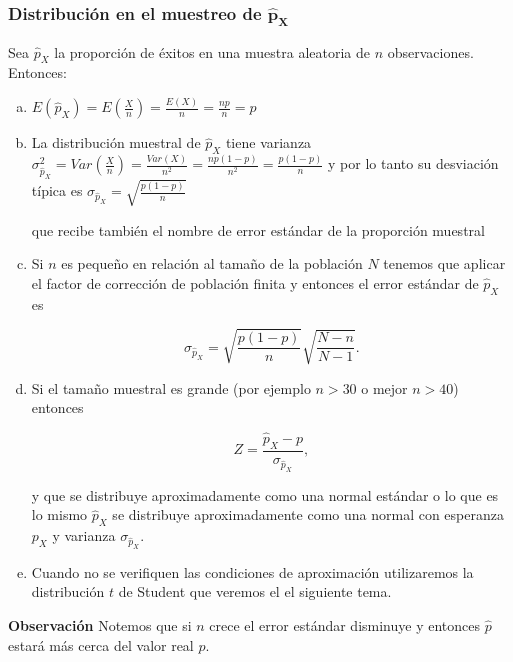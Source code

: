 \documentclass[12pt]{report}
\begin{document}
    \subsubsection{Distribución en el muestreo de   $\mathbf{\hat{p}_{X}}$}

    Sea   $\hat{p}_{X}$ la proporción de éxitos en una muestra
    aleatoria de $n$ observaciones. Entonces:

    \begin{enumerate}[a)]
    \item  $E(\hat{p}_{X})=E(\frac{X}{n})=\frac{E(X)}{n}=\frac{np}{n}=p$
    \item  La distribución muestral de $\hat{p}_{X}$  tiene
    varianza $\sigma_{\hat{p}_{X}}^2=Var(\frac{X}{n})=\frac{Var(X)}{n^2}
    =\frac{np(1-p)}{n^2}=\frac{p(1-p)}{n}$ y por lo tanto su desviación
    típica es
    $\sigma_{\hat{p}_{X} }=\sqrt{\frac{p(1-p)}{n}}$

    que recibe también el nombre de error estándar de la proporción
    muestral
    \item Si $n$ es pequeño en relación al tamaño de la población $N$
    tenemos que aplicar el factor de corrección de población finita
  y entonces el error estándar de  $\hat{p}_{X}$  es

    $$\sigma_{\hat{p}_{X} }=\sqrt{\frac{p(1-p)}{n}}
  \sqrt{\frac{N-n}{N-1}}.$$
  \item Si el tamaño muestral es grande (por ejemplo $n>30$ o mejor  $n>40$) entonces

  $$Z=\frac{\hat{p}_{X}- p}{\sigma_{\hat{p}_{X}}},$$

  y que se distribuye aproximadamente como una normal estándar
  o lo que es lo mismo $\hat{p}_{X}$ se distribuye aproximadamente
  como una normal con esperanza $p_{X}$ y varianza
  $\sigma_{\hat{p}_{X}}$.

  \item Cuando no se verifiquen las condiciones de aproximación
  utilizaremos la distribución $t$ de Student que veremos el el siguiente tema.
\end{enumerate}

 \textbf{Observación} Notemos que si $n$ crece el error estándar
    disminuye y entonces $\hat{p}$ estará más cerca del valor real $p$.
\end{document}
